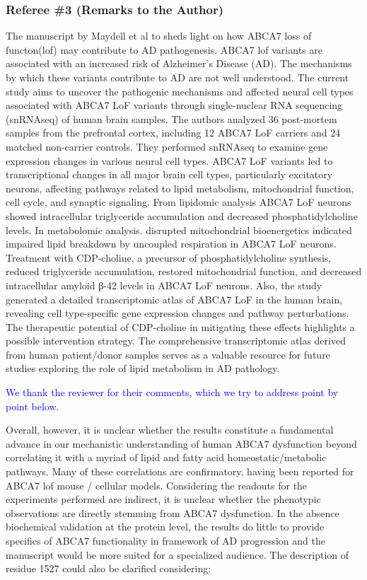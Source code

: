 \subsubsection{Referee \#3 (Remarks to the Author)}
The manuscript by Maydell et al to sheds light on how ABCA7 loss of functon(lof) may contribute to AD pathogenesis. ABCA7 lof variants are associated with an increased risk of Alzheimer's Disease (AD). The mechanisms by which these variants contribute to AD are not well understood. The current study aims to uncover the pathogenic mechanisms and affected neural cell types associated with ABCA7 LoF variants through single-nuclear RNA sequencing (snRNAseq) of human brain samples. The authors analyzed 36 post-mortem samples from the prefrontal cortex, including 12 ABCA7 LoF carriers and 24 matched non-carrier controls. They performed snRNAseq to examine gene expression changes in various neural cell types. ABCA7 LoF variants led to transcriptional changes in all major brain cell types, particularly excitatory neurons, affecting pathways related to lipid metabolism, mitochondrial function, cell cycle, and synaptic signaling. From lipidomic analysis ABCA7 LoF neurons showed intracellular triglyceride accumulation and decreased phosphatidylcholine levels. In metabolomic analysis. disrupted mitochondrial bioenergetics indicated impaired lipid breakdown by uncoupled respiration in ABCA7 LoF neurons. Treatment with CDP-choline, a precursor of phosphatidylcholine synthesis, reduced triglyceride accumulation, restored mitochondrial function, and decreased intracellular amyloid β-42 levels in ABCA7 LoF neurons. Also, the study generated a detailed transcriptomic atlas of ABCA7 LoF in the human brain, revealing cell type-specific gene expression changes and pathway perturbations. The therapeutic potential of CDP-choline in mitigating these effects highlights a possible intervention strategy. The comprehensive transcriptomic atlas derived from human patient/donor samples serves as a valuable resource for future studies exploring the role of lipid metabolism in AD pathology.

\textcolor{blue}{We thank the reviewer for their comments, which we try to address point by point below.}

Overall, however, it is unclear whether the results constitute a fundamental advance in our mechanistic understanding of human ABCA7 dysfunction beyond correlating it with a myriad of lipid and fatty acid homeostatic/metabolic pathways. Many of these correlations are confirmatory, having been reported for ABCA7 lof mouse / cellular models. Considering the readouts for the experiments performed are indirect, it is unclear whether the phenotypic observations are directly stemming from ABCA7 dysfunction. In the absence biochemical validation at the protein level, the results do little to provide specifics of ABCA7 functionality in framework of AD progression and the manuscript would be more suited for a specialized audience. The description of residue 1527 could also be clarified considering:

